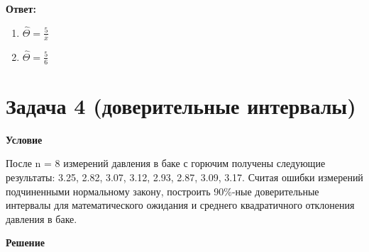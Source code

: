 \documentclass[a4paper,14pt]{extreport} %
\begin{document}
\hfill

\textbf{Ответ:}

\begin{enumerate}
\item $\hat \Theta = \frac{5}{\overline x}$
\item $\hat \Theta =\frac{5}{6}$
\end{enumerate}

\section{Задача 4 (доверительные интервалы)}

\hfill

\textbf{Условие}

После n = 8 измерений давления в баке с горючим получены следующие результаты: 3.25, 2.82, 3.07, 3.12, 2.93, 2.87, 3.09, 3.17. Считая ошибки измерений подчиненными нормальному закону, построить 90\%-ные доверительные интервалы для математического ожидания и среднего квадратичного отклонения давления в баке.

\hfill

\textbf{Решение}

\hfill
\end{document}
